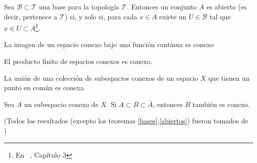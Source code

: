 \documentclass[fleqn,leqno,11pt,letterpaper,final]{article}
\begin{document}
\begin{teo}\label{abiertos}
	Sea $\mathcal{B}\subset\mathcal{T}$ una base para la topología $\mathcal{T}$. Entonces un conjunto $A$
	es abierto (es decir, pertenece a $\mathcal{T}$) si, y solo si, para cada $x\in A$ existe un
	$U\in\mathcal{B}$ tal que $x\in U\subset A$\footnote{En ~\cite{dugundji_topology_1987}, Capítulo 3}.
\end{teo}
\begin{teo}\label{conex:contfunct}
	La imagen de un espacio conexo bajo una función continua es conexo
\end{teo}
\begin{teo}\label{conex:prod}
	El producto finito de espacios conexos es conexo.
\end{teo}
\begin{teo}\label{conex:union}
	La unión de una colección de subespacios conexos de un espacio $X$ que tienen un
	punto en común es conexa.
\end{teo}
\begin{teo}\label{conex:cerra}
	Sea $A$ un subespacio conexo de $X$. Si $A\subset B\subset\bar A$, entonces $B$
	también es conexo.
\end{teo}
\begin{flushright}\scriptsize
	(Todos los resultados (excepto los teoremas \ref{bases},\ref{abiertos}) fueron tomados de \cite{munkres_topology_2014})
\end{flushright}
\printbibliography[
heading=bibintoc,
title={Referencias}
]
\end{document}
